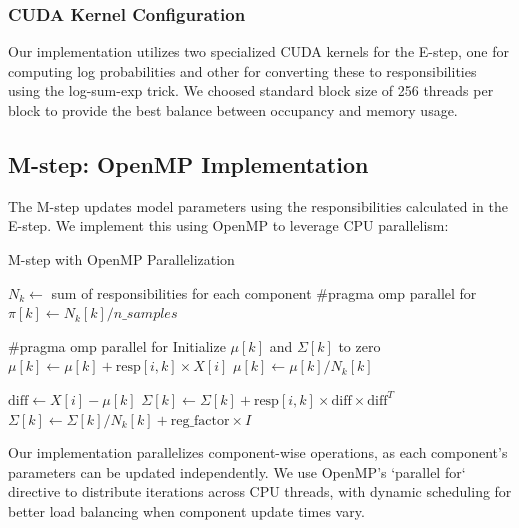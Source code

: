 \documentclass[conference]{IEEEtran}
\begin{document}
\subsubsection{CUDA Kernel Configuration}

Our implementation utilizes two specialized CUDA kernels for the E-step, one for computing log probabilities and other for converting these to responsibilities using the log-sum-exp trick. We choosed standard block size of 256 threads per block to provide the best balance between occupancy and memory usage.

\subsection{M-step: OpenMP Implementation}

The M-step updates model parameters using the responsibilities calculated in the E-step. We implement this using OpenMP to leverage CPU parallelism:

\begin{algorithm}
\caption{M-step with OpenMP Parallelization}
\begin{algorithmic}[1]
\STATE $N_k \gets$ sum of responsibilities for each component
\STATE \#pragma omp parallel for
    \STATE $\pi[k] \gets N_k[k] / n\_samples$
\ENDFOR

\STATE \#pragma omp parallel for
        \STATE Initialize $\mu[k]$ and $\Sigma[k]$ to zero
            \STATE $\mu[k] \gets \mu[k] + \text{resp}[i,k] \times X[i]$
        \ENDFOR
        \STATE $\mu[k] \gets \mu[k] / N_k[k]$
        
            \STATE $\text{diff} \gets X[i] - \mu[k]$
            \STATE $\Sigma[k] \gets \Sigma[k] + \text{resp}[i,k] \times \text{diff} \times \text{diff}^T$
        \ENDFOR
        \STATE $\Sigma[k] \gets \Sigma[k] / N_k[k] + \text{reg\_factor} \times I$
    \ENDIF
\ENDFOR
\end{algorithmic}
\end{algorithm}

Our implementation parallelizes component-wise operations, as each component's parameters can be updated independently. We use OpenMP's `parallel for` directive to distribute iterations across CPU threads, with dynamic scheduling for better load balancing when component update times vary. 
\end{document}
